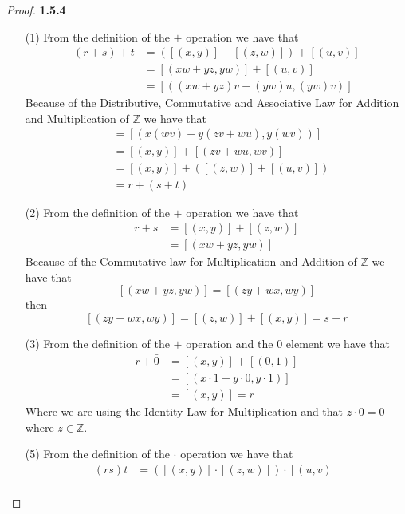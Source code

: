 \documentclass[11pt]{article}
\newcommand{\Z}{\mathbb{Z}}
\theoremstyle{definition}
\begin{document}
    \begin{proof}{\textbf{1.5.4}}
        \begin{itemize}
        \item [(1)]
        From the definition of the $+$ operation we have that
        \begin{align*}
            (r+s)+t &= ([(x,y)]+[(z,w)]) + [(u,v)]\\
                    &= [(xw+yz,yw)]+ [(u,v)]\\
                    &= [((xw+yz)v+(yw)u,(yw)v)]
        \end{align*}
        Because of the Distributive, Commutative and Associative Law for Addition and
        Multiplication of $\Z$ we have that
        \begin{align*}
            [((xw+yz)v+(yw)u,(yw)v)] &= [(x(wv)+y(zv+wu),y(wv))]\\
                                     &= [(x, y)]+[(zv+wu, wv)]\\
                                     &= [(x, y)] + ([(z, w)]+[(u, v)])\\
                                     &= r + (s + t)     
        \end{align*}
        \item [(2)]
        From the definition of the $+$ operation we have that
        \begin{align*}
            r+s &= [(x,y)]+[(z,w)]\\
                &= [(xw+yz,yw)]
        \end{align*}
        Because of the Commutative law for Multiplication and Addition of $\Z$ we have
        that
        $$[(xw+yz,yw)] = [(zy+wx,wy)]$$
        then
        $$[(zy+wx,wy)] = [(z,w)] + [(x,y)] = s + r$$
        \item [(3)]
        From the definition of the $+$ operation and the $\bar{0}$ element we have that
        \begin{align*}
            r+\bar{0} &= [(x,y)]+[(0,1)]\\
                &= [(x\cdot 1+y\cdot 0,y\cdot 1)] \\
                &= [(x,y)] = r
        \end{align*}
        Where we are using the Identity Law for Multiplication and that $z\cdot 0 = 0$
        where $z \in \Z$.
        \item [(5)]
        From the definition of the $\cdot$ operation we have that
        \begin{align*}
            (rs)t &= ([(x,y)]\cdot [(z,w)]) \cdot [(u,v)] \\

\end{align*}
\end{itemize}
\end{proof}
\end{document}

